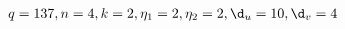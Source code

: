 \documentclass[preview]{standalone}
\begin{document}
\begin{align*}
q= 137 , n= 4 , k= 2 , \eta_1= 2 , \eta_2= 2 , \d_u= 10 , \d_v= 4
\end{align*}
\end{document}
